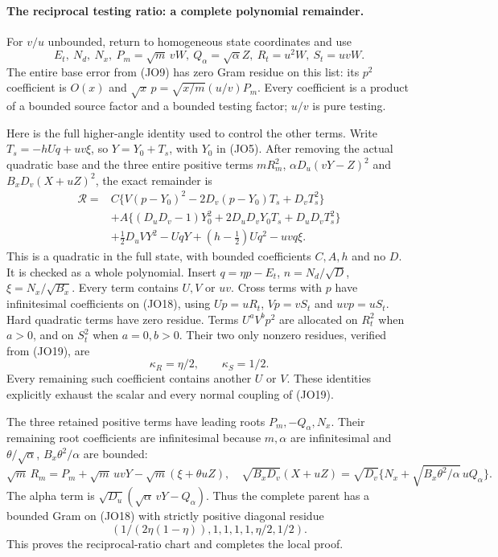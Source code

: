 \paragraph{The reciprocal testing ratio: a complete polynomial remainder.}
For $v/u$ unbounded, return to homogeneous state coordinates and use
\[
 E_t,\ N_d,\ N_x,\ P_m=\sqrt m\,vW,\ Q_\alpha=\sqrt\alpha Z,
                  \ R_t=u^2W,\ S_t=uvW.              \tag{JO18}
\]
The entire base error from (JO9) has zero Gram residue on this list:
its $p^2$ coefficient is $O(x)$ and
$\sqrt x\,p=\sqrt{x/m}(u/v)P_m$. Every coefficient is a product
of a bounded source factor and a bounded testing factor; $u/v$ is
pure testing.

Here is the full higher-angle identity used to control the other terms.
Write $T_s=-hUq+uv\xi$, so $Y=Y_0+T_s$, with $Y_0$ in
(JO5). After removing the actual quadratic base and the three entire
positive terms $mR_m^2$, $\alpha D_u(vY-Z)^2$ and
$B_xD_v(X+uZ)^2$, the exact remainder is
\[
 \begin{aligned}
 \mathcal R={}&C\{V(p-Y_0)^2-2D_v(p-Y_0)T_s+D_vT_s^2\}\\
 &+A\{(D_uD_v-1)Y_0^2+2D_uD_vY_0T_s+D_uD_vT_s^2\}\\
 &+\tfrac12D_uVY^2-UqY+(h-\tfrac12)Uq^2-uvq\xi .
 \end{aligned}                                                \tag{JO19}
\]
This is a quadratic in the full state, with bounded coefficients
$C,A,h$ and no $D$. It is checked as a whole polynomial. Insert
$q=\eta p-E_t$, $n=N_d/\sqrt D$, $\xi=N_x/\sqrt{B_x}$.
Every term contains $U,V$ or $uv$. Cross terms with $p$ have
infinitesimal coefficients on (JO18), using $Up=uR_t$,
$Vp=vS_t$ and $uvp=uS_t$. Hard quadratic terms have zero
residue. Terms $U^aV^bp^2$ are allocated on $R_t^2$ when
$a>0$, and on $S_t^2$ when $a=0,b>0$. Their two only nonzero
residues, verified from (JO19), are
\[
                         \kappa_R=\eta/2,\qquad
                         \kappa_S=1/2.               \tag{JO20}
\]
Every remaining such coefficient contains another $U$ or $V$.
These identities explicitly exhaust the scalar and every normal
coupling of (JO19).

The three retained positive terms have leading roots
$P_m,-Q_\alpha,N_x$. Their remaining root coefficients are
infinitesimal because $m,\alpha$ are infinitesimal and
$\theta/\sqrt\alpha$, $B_x\theta^2/\alpha$ are bounded:
\[
 \sqrt m\,R_m=P_m+\sqrt m\,uvY-\sqrt m(\xi+\theta uZ),
 \quad
 \sqrt{B_xD_v}(X+uZ)=
 \sqrt{D_v}\{N_x+\sqrt{B_x\theta^2/\alpha}\,uQ_\alpha\}.
\]
The alpha term is $\sqrt{D_u}(\sqrt\alpha\,vY-Q_\alpha)$.
Thus the complete parent has a bounded Gram on (JO18) with strictly
positive diagonal residue
\[
             (1/(2\eta(1-\eta)),1,1,1,1,\eta/2,1/2).
                                                               \tag{JO21}
\]
This proves the reciprocal-ratio chart and completes the local proof.

